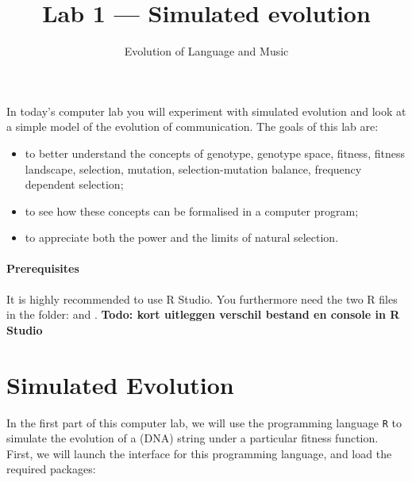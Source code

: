 \documentclass[a4paper, 9pt]{article}
\title{Lab 1 --- Simulated evolution}
\author{Evolution of Language and Music}
\begin{document}
\maketitle

\begin{goals}
In today's computer lab you will experiment with simulated evolution and
look at a simple model of the evolution of communication. The goals of
this lab are:
\begin{itemize}
\item to better understand the concepts of genotype, genotype space, fitness, fitness landscape, selection, mutation, selection-mutation balance, frequency dependent selection;
\item to see how these concepts can be formalised in a computer program;
\item to appreciate both the power and the limits of natural selection.
\end{itemize}
\end{goals}

\paragraph{Prerequisites}
It is highly recommended to use R Studio. You furthermore need the two R files in the  folder:  and .
\textbf{Todo: kort uitleggen verschil bestand en console in R Studio}



\section{Simulated Evolution}\label{simulated-evolution}

In the first part of this computer lab, we will use the programming
language \texttt{R} to simulate the evolution of a (DNA) string under a
particular fitness function. First, we will launch the interface for
this programming language, and load the required packages:
\end{document}
